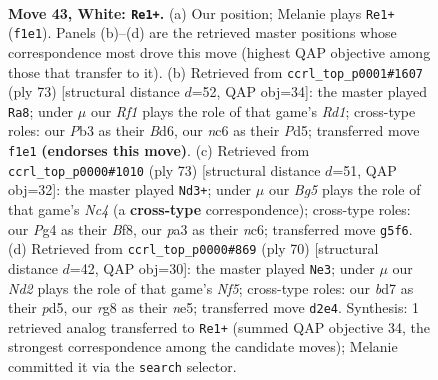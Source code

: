 \documentclass[11pt]{article}
\begin{document}
\clearpage

\begin{figure}[p]\centering
\begin{subfigure}{0.46\textwidth}\centering
\resizebox{\linewidth}{!}{%
\newchessgame
\chessboard[
  setfen={4k1r1/3b3R/2n5/6B1/1p1p2P1/pP6/P1PN3K/5R2 w - - 8 43},
  showmover=false,
  pgfstyle=straightmove, color=movearrow, markmove={f1-e1}
]}
\caption{}
\end{subfigure}\hfill
\begin{subfigure}{0.46\textwidth}\centering
\resizebox{\linewidth}{!}{%
\newchessgame
\chessboard[
  setfen={3r4/5k2/1p1b4/2pp1p2/P3n3/2P4P/1PN2BP1/R5K1 b - - 3 37},
  showmover=false,
  pgfstyle=straightmove, color=movearrow, markmove={d8-a8}
]}
\caption{}
\end{subfigure}
\\[4pt]
\begin{subfigure}{0.46\textwidth}\centering
\resizebox{\linewidth}{!}{%
\newchessgame
\chessboard[
  setfen={5b2/3r3k/p1N3p1/2n2p1p/5P2/4PBPP/2R2K2/8 b - - 7 37},
  showmover=false,
  pgfstyle=straightmove, color=movearrow, markmove={c5-d3}
]}
\caption{}
\end{subfigure}\hfill
\begin{subfigure}{0.46\textwidth}\centering
\resizebox{\linewidth}{!}{%
\newchessgame
\chessboard[
  setfen={4k1r1/1p3p2/2b5/p2pnN2/3R2B1/1PP4P/P7/2K5 w - - 3 36},
  showmover=false,
  pgfstyle=straightmove, color=movearrow, markmove={f5-e3}
]}
\caption{}
\end{subfigure}
\caption{\textbf{Move 43, White: \texttt{Re1+}.} (a) Our position; Melanie plays \texttt{Re1+} (\texttt{f1e1}). Panels (b)--(d) are the retrieved master positions whose correspondence most drove this move (highest QAP objective among those that transfer to it). (b) Retrieved from \texttt{ccrl\_top\_p0001\#1607} (ply 73) [structural distance $d$=52, QAP obj=34]: the master played \texttt{Ra8}; under $\mu$ our \emph{Rf1} plays the role of that game's \emph{Rd1}; cross-type roles: our \emph{P}b3 as their \emph{B}d6, our \emph{n}c6 as their \emph{P}d5; transferred move \texttt{f1e1} \textbf{(endorses this move)}. (c) Retrieved from \texttt{ccrl\_top\_p0000\#1010} (ply 73) [structural distance $d$=51, QAP obj=32]: the master played \texttt{Nd3+}; under $\mu$ our \emph{Bg5} plays the role of that game's \emph{Nc4} (a \textbf{cross-type} correspondence); cross-type roles: our \emph{P}g4 as their \emph{B}f8, our \emph{p}a3 as their \emph{n}c6; transferred move \texttt{g5f6}. (d) Retrieved from \texttt{ccrl\_top\_p0000\#869} (ply 70) [structural distance $d$=42, QAP obj=30]: the master played \texttt{Ne3}; under $\mu$ our \emph{Nd2} plays the role of that game's \emph{Nf5}; cross-type roles: our \emph{b}d7 as their \emph{p}d5, our \emph{r}g8 as their \emph{n}e5; transferred move \texttt{d2e4}. Synthesis: 1 retrieved analog transferred to \texttt{Re1+} (summed QAP objective 34, the strongest correspondence among the candidate moves); Melanie committed it via the \texttt{search} selector.}
\label{fig:thought-m84}
\end{figure}
\end{document}

